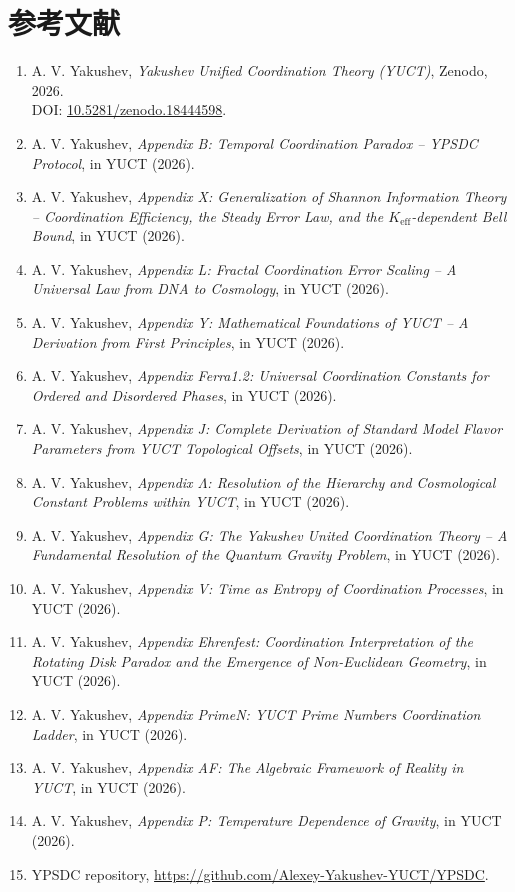 \documentclass[11pt,a4paper]{article}
\begin{document}
	\section*{参考文献}
	\begin{enumerate}
		\item A. V. Yakushev, \emph{Yakushev Unified Coordination Theory (YUCT)}, Zenodo, 2026. \\ DOI: \href{https://doi.org/10.5281/zenodo.18444598}{10.5281/zenodo.18444598}.
		\item A. V. Yakushev, \emph{Appendix B: Temporal Coordination Paradox – YPSDC Protocol}, in YUCT (2026).
		\item A. V. Yakushev, \emph{Appendix X: Generalization of Shannon Information Theory – Coordination Efficiency, the Steady Error Law, and the \(K_{\mathrm{eff}}\)-dependent Bell Bound}, in YUCT (2026).
		\item A. V. Yakushev, \emph{Appendix L: Fractal Coordination Error Scaling – A Universal Law from DNA to Cosmology}, in YUCT (2026).
		\item A. V. Yakushev, \emph{Appendix Y: Mathematical Foundations of YUCT – A Derivation from First Principles}, in YUCT (2026).
		\item A. V. Yakushev, \emph{Appendix Ferra1.2: Universal Coordination Constants for Ordered and Disordered Phases}, in YUCT (2026).
		\item A. V. Yakushev, \emph{Appendix J: Complete Derivation of Standard Model Flavor Parameters from YUCT Topological Offsets}, in YUCT (2026).
		\item A. V. Yakushev, \emph{Appendix \(\Lambda\): Resolution of the Hierarchy and Cosmological Constant Problems within YUCT}, in YUCT (2026).
		\item A. V. Yakushev, \emph{Appendix G: The Yakushev United Coordination Theory – A Fundamental Resolution of the Quantum Gravity Problem}, in YUCT (2026).
		\item A. V. Yakushev, \emph{Appendix V: Time as Entropy of Coordination Processes}, in YUCT (2026).
		\item A. V. Yakushev, \emph{Appendix Ehrenfest: Coordination Interpretation of the Rotating Disk Paradox and the Emergence of Non-Euclidean Geometry}, in YUCT (2026).
		\item A. V. Yakushev, \emph{Appendix PrimeN: YUCT Prime Numbers Coordination Ladder}, in YUCT (2026).
		\item A. V. Yakushev, \emph{Appendix AF: The Algebraic Framework of Reality in YUCT}, in YUCT (2026).
		\item A. V. Yakushev, \emph{Appendix P: Temperature Dependence of Gravity}, in YUCT (2026).
		\item YPSDC repository, \url{https://github.com/Alexey-Yakushev-YUCT/YPSDC}.
	\end{enumerate}
	
\end{document}
